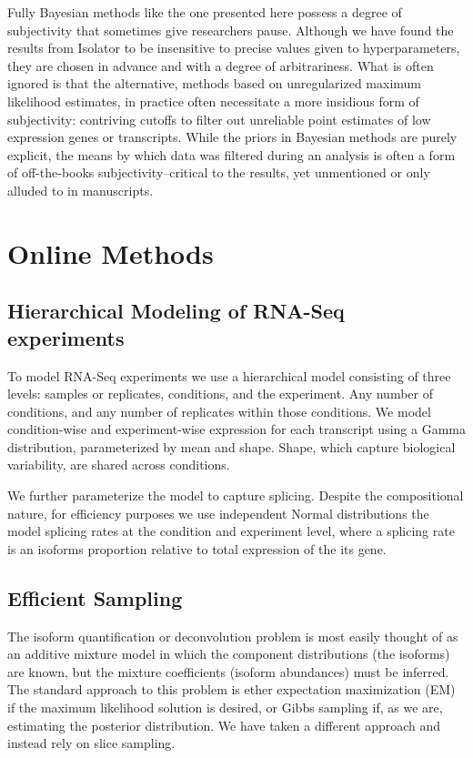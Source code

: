 \documentclass[twocolumn]{article}
\begin{document}
Fully Bayesian methods like the one presented here possess a degree of
subjectivity that sometimes give researchers pause. Although we have
found the results from Isolator to be insensitive to precise values
given to hyperparameters, they are chosen in advance and with a degree
of arbitrariness. What is often ignored is that the alternative, methods
based on unregularized maximum likelihood estimates, in practice often
necessitate a more insidious form of subjectivity: contriving cutoffs to
filter out unreliable point estimates of low expression genes or
transcripts. While the priors in Bayesian methods are purely explicit,
the means by which data was filtered during an analysis is often a form
of off-the-books subjectivity--critical to the results, yet unmentioned
or only alluded to in manuscripts.

\section{Online Methods}\label{online-methods}

\subsection{Hierarchical Modeling of RNA-Seq
experiments}\label{hierarchical-modeling-of-rna-seq-experiments}

To model RNA-Seq experiments we use a hierarchical model consisting of
three levels: samples or replicates, conditions, and the experiment. Any
number of conditions, and any number of replicates within those
conditions. We model condition-wise and experiment-wise expression for
each transcript using a Gamma distribution, parameterized by mean and
shape. Shape, which capture biological variability, are shared across
conditions.

We further parameterize the model to capture splicing. Despite the
compositional nature, for efficiency purposes we use independent Normal
distributions the model splicing rates at the condition and experiment
level, where a splicing rate is an isoforms proportion relative to total
expression of the its gene.

\subsection{Efficient Sampling}\label{efficient-sampling}

The isoform quantification or deconvolution problem is most easily
thought of as an additive mixture model in which the component
distributions (the isoforms) are known, but the mixture coefficients
(isoform abundances) must be inferred. The standard approach to this
problem is ether expectation maximization (EM) if the maximum likelihood
solution is desired, or Gibbs sampling if, as we are, estimating the
posterior distribution. We have taken a different approach and instead
rely on slice sampling.
\end{document}
